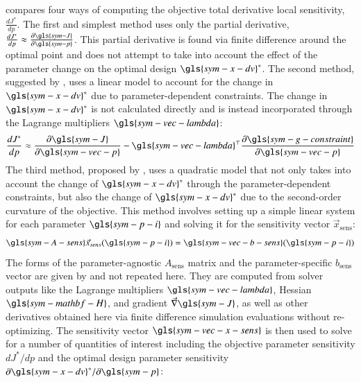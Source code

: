  compares four ways of computing the objective total derivative local sensitivity, $\frac{dJ^*}{dp}$.
The first and simplest method uses only the partial derivative, $\frac{dJ^*}{dp}\approx \frac{\partial \gls{sym-J}}{\partial \gls{sym-p}}$.
This partial derivative is found via finite difference around the optimal point and does not attempt to take into account the effect of the parameter change on the optimal design $\gls{sym-x-dv}^*$.
The second method, suggested by \citet{martins_engineering_2022}, uses a linear model to account for the change in $\gls{sym-x-dv}^*$ due to parameter-dependent constraints.
The change in $\gls{sym-x-dv}^*$ is not calculated directly and is instead incorporated through the Lagrange multipliers $\gls{sym-vec-lambda}$:
\begin{equation}
\frac{dJ^*}{dp} \approx \frac{\partial \gls{sym-J}}{\partial \gls{sym-vec-p}} -  \gls{sym-vec-lambda}^{\top} \frac{\partial \gls{sym-g-constraint}}{\partial \gls{sym-vec-p}}
\end{equation}
The third method, proposed by \citet{sobieszczanski-sobieski_sensitivity_1982}, uses a quadratic model that not only takes into account the change of $\gls{sym-x-dv}^*$ through the parameter-dependent constraints, but also the change of $\gls{sym-x-dv}^*$ due to the second-order curvature of the objective.
This method involves setting up a simple linear system for each parameter $\gls{sym-p-i}$ and solving it for the sensitivity vector $\vec{x}_{\text{sens}}$:
\begin{equation}
    \gls{sym-A-sens} \vec{x}_{sens}(\gls{sym-p-i}) = \gls{sym-vec-b-sens}(\gls{sym-p-i})
\end{equation}
The forms of the parameter-agnostic $A_{\text{sens}}$ matrix and the parameter-specific $b_{\text{sens}}$ vector are given by \citet{sobieszczanski-sobieski_sensitivity_1982} and not repeated here.
They are computed from solver outputs like the Lagrange multipliers $\gls{sym-vec-lambda}$, Hessian $\gls{sym-mathbf-H}$, and gradient $\vec{\nabla} \gls{sym-J}$, as well as other derivatives %
obtained here via finite difference simulation evaluations %
without re-optimizing.
The sensitivity vector $\gls{sym-vec-x-sens}$ is then used to solve for a number of quantities of interest including the objective parameter sensitivity $dJ^*/dp$ and the optimal design parameter sensitivity $\partial \gls{sym-x-dv}^*/\partial \gls{sym-p}$: %
